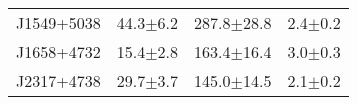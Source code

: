 \documentclass[proof]{WileyASNA-v1}
\begin{document}
\begin{table}[h!]
\begin{tabular}{cccc}
J1549+5038 & 44.3${\pm}$6.2&287.8${\pm}$28.8 &2.4${\pm}$0.2\\
J1658+4732 &15.4${\pm}$2.8 &163.4${\pm}$16.4 &3.0${\pm}$0.3\\
J2317+4738 &29.7${\pm}$3.7 &145.0${\pm}$14.5 &2.1${\pm}$0.2\\
\hline
\end{tabular}
\label{table:spec-prop}
\end{table}

\end{document}
